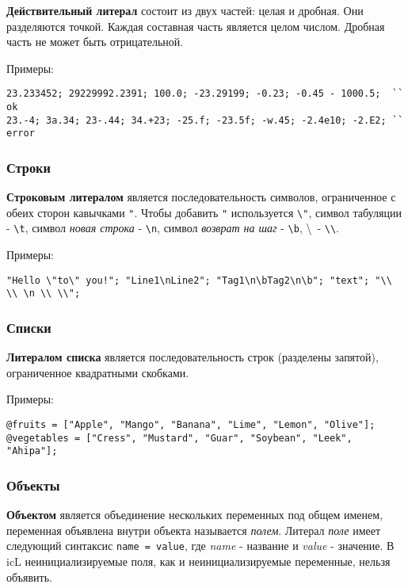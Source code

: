{\bf Действительный литерал} состоит из двух частей: целая и дробная. Они разделяются точкой. Каждая составная часть является целом числом. Дробная часть не может быть отрицательной.

\noindent Примеры:
\begin{lstlisting}[numbers=none]
23.233452; 29229992.2391; 100.0; -23.29199; -0.23; -0.45 - 1000.5;  `` ok
23.-4; 3а.34; 23-.44; 34.+23; -25.f; -23.5f; -w.45; -2.4e10; -2.E2; `` error
\end{lstlisting}

\subsubsection{Строки}

{\bf Строковым литералом} является последовательность символов, ограниченное с обеих сторон кавычками \lstinline|"|. Чтобы добавить \lstinline|"| используется \lstinline|\"|, символ табуляции - \lstinline|\t|, символ {\it новая строка} - \lstinline|\n|, символ {\it возврат на шаг} - \lstinline|\b|, \textbackslash \ - \lstinline|\\|.

\noindent Примеры:
\begin{lstlisting}[numbers=none]
"Hello \"to\" you!"; "Line1\nLine2"; "Tag1\n\bTag2\n\b"; "text"; "\\ \\ \n \\ \\";
\end{lstlisting}

\subsubsection{Списки}

{\bf Литералом списка} является последовательность строк (разделены запятой), ограниченное квадратными скобками.

\noindent Примеры:
\begin{lstlisting}[numbers=none]
@fruits = ["Apple", "Mango", "Banana", "Lime", "Lemon", "Olive"];
@vegetables = ["Cress", "Mustard", "Guar", "Soybean", "Leek", "Ahipa"];
\end{lstlisting}

\subsubsection{Объекты}

{\bf Объектом} является объединение нескольких переменных под общем именем, переменная объявлена внутри объекта называется {\it полем}. Литерал {\it поле} имеет следующий синтаксис \lstinline|name = value|, где  {\it name} - название и {\it value} - значение. В icL неинициализируемые поля, как и неинициализируемые переменные, нельзя объявить.

